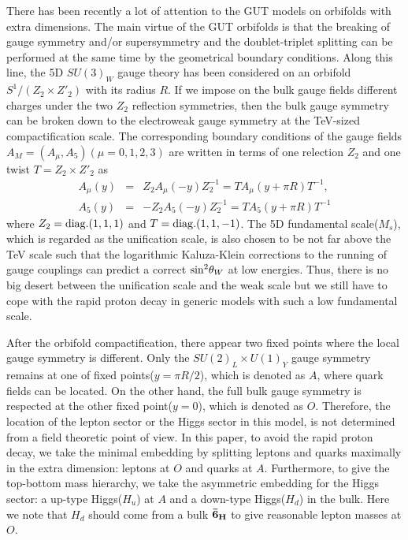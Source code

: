 \documentclass[a4paper,11pt]{article}
\begin{document}
There has been recently a lot of attention to the GUT models 
on orbifolds with extra dimensions\cite{kawamura,kkl1}.
The main virtue of the GUT orbifolds is that the breaking of gauge symmetry 
and/or supersymmetry
and the doublet-triplet splitting can be performed at the same time
by the geometrical boundary conditions. 
Along this line, the 5D $SU(3)_W$ gauge theory has been considered 
on an orbifold $S^1/(Z_2\times Z'_2)$ with its radius $R$\cite{su3,hall,kkl2}.
If we impose on the bulk gauge fields different charges 
under the two $Z_2$ reflection
symmetries, then the bulk gauge symmetry can be broken down
to the electroweak gauge symmetry at the TeV-sized compactification scale.
The corresponding boundary conditions of the gauge fields 
$A_M=(A_\mu,A_5)(\mu=0,1,2,3)$ are written in terms of one relection $Z_2$
and one twist $T=Z_2\times Z'_2$ as
\begin{eqnarray}
A_\mu(y)&=&Z_2 A_\mu(-y) Z_2^{-1}=TA_\mu(y+\pi R)T^{-1}, \\
A_5(y)&=&-Z_2 A_5(-y) Z_2^{-1}=TA_5(y+\pi R)T^{-1}
\end{eqnarray}
where $Z_2={\rm diag.}(1,1,1)$ and $T={\rm diag.}(1,1,-1)$. 
The 5D fundamental scale($M_s$), which is regarded as the unification scale, 
is also chosen to be not far above the TeV scale
such that the logarithmic Kaluza-Klein
corrections to the running of gauge couplings can predict
a correct ${\rm sin}^2\theta_W$ at low energies.
Thus, there is no big desert between the unification scale and the weak scale
but we still have to cope with the rapid proton decay
in generic models with such a low fundamental scale.

After the orbifold compactification, there appear two fixed points
where the local gauge symmetry is different. Only the $SU(2)_L\times U(1)_Y$
gauge symmetry remains at one of fixed points($y=\pi R/2$),
which is denoted as $A$, where
quark fields can be located. On the other hand, the full bulk gauge symmetry
is respected at the other fixed point($y=0$), which is denoted as $O$.
Therefore, the location of the lepton sector
or the Higgs sector in this model, is not determined
from a field theoretic point of view.
In this paper, to avoid the rapid proton decay,
we take the minimal embedding
by splitting leptons and quarks maximally in the extra dimension:
leptons at $O$ and quarks at $A$\cite{su3,hall,kkl2}.
Furthermore, to give the top-bottom mass hierarchy,
we take the asymmetric embedding for the Higgs
sector: a up-type Higgs($H_u$) at $A$
and a down-type Higgs($H_d$) in the bulk\cite{kkl1,kkl2}. Here we note that 
$H_d$ should come from a bulk $\bf {\bar 6}_H$ to give reasonable lepton masses
at $O$. 
\end{document}
